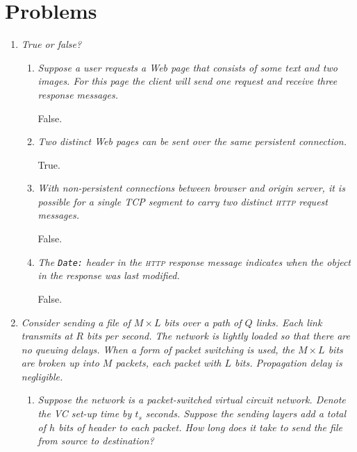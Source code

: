 \section{Problems}

\begin{enumerate}

  \item \emph{True or false?}
  \begin{enumerate}

    \item \emph{Suppose a user requests a Web page that consists of
      some text and two images. For this page the client will send one
      request and receive three response messages.}

     False.

    \item \emph{Two distinct Web pages can be sent over the same
      persistent connection.}

    True.

    \item \emph{With non-persistent connections between browser and
      origin ser\-ver, it is possible for a single TCP segment to
      carry two distinct \textsc{http} request messages.}

    False.

    \item \emph{The \texttt{Date:} header in the \textsc{http} response
      message indicates when the object in the response was last
      modified.}
   
    False.

  \end{enumerate}

  \item \emph{Consider sending a file of \(M \times L\) bits over a
    path of \(Q\) links. Each link transmits at \(R\) bits per
    second. The network is lightly loaded so that there are no queuing
    delays. When a form of packet switching is used, the \(M \times
    L\) bits are broken up into \(M\) packets, each packet with \(L\)
    bits. Propagation delay is negligible.}
    \begin{enumerate}

      \item \emph{Suppose the network is a packet-switched virtual
        circuit network. Denote the VC set-up time by \(t_s\)
        seconds. Suppose the sending layers add a total of \(h\) bits
        of header to each packet. How long does it take to send the
        file from source to destination?}


\end{enumerate}
\end{enumerate}
